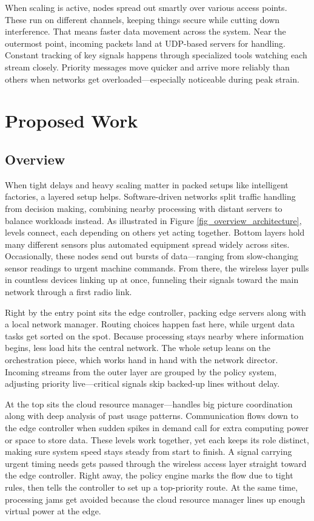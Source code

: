 \documentclass[a4paper,fleqn]{cas-dc}
\numberwithin{equation}{section}
\begin{document}
When scaling is active, nodes spread out smartly over various access points. These run on different channels, keeping things secure while cutting down interference. That means faster data movement across the system. Near the outermost point, incoming packets land at UDP-based servers for handling. Constant tracking of key signals happens through specialized tools watching each stream closely. Priority messages move quicker and arrive more reliably than others when networks get overloaded—especially noticeable during peak strain.

\section{Proposed Work}

\subsection{Overview}

When tight delays and heavy scaling matter in packed setups like intelligent factories, a layered setup helps. Software-driven networks split traffic handling from decision making, combining nearby processing with distant servers to balance workloads instead. As illustrated in Figure \ref{fig_overview_architecture}, levels connect, each depending on others yet acting together. Bottom layers hold many different sensors plus automated equipment spread widely across sites. Occasionally, these nodes send out bursts of data—ranging from slow-changing sensor readings to urgent machine commands. From there, the wireless layer pulls in countless devices linking up at once, funneling their signals toward the main network through a first radio link.

Right by the entry point sits the edge controller, packing edge servers along with a local network manager. Routing choices happen fast here, while urgent data tasks get sorted on the spot. Because processing stays nearby where information begins, less load hits the central network. The whole setup leans on the orchestration piece, which works hand in hand with the network director. Incoming streams from the outer layer are grouped by the policy system, adjusting priority live—critical signals skip backed-up lines without delay.

At the top sits the cloud resource manager—handles big picture coordination along with deep analysis of past usage patterns. Communication flows down to the edge controller when sudden spikes in demand call for extra computing power or space to store data. These levels work together, yet each keeps its role distinct, making sure system speed stays steady from start to finish. A signal carrying urgent timing needs gets passed through the wireless access layer straight toward the edge controller. Right away, the policy engine marks the flow due to tight rules, then tells the controller to set up a top-priority route. At the same time, processing jams get avoided because the cloud resource manager lines up enough virtual power at the edge.
\end{document}
